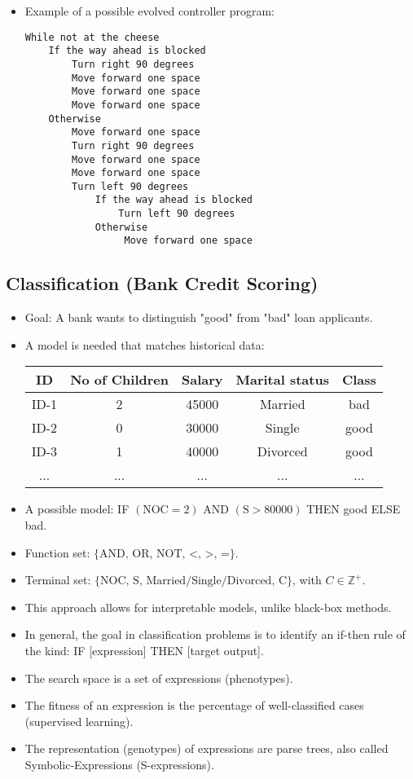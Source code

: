 \begin{itemize}
    \item Example of a possible evolved controller program:

\begin{lstlisting}[]
While not at the cheese
    If the way ahead is blocked
        Turn right 90 degrees
        Move forward one space
        Move forward one space
        Move forward one space
    Otherwise
        Move forward one space
        Turn right 90 degrees
        Move forward one space
        Move forward one space
        Turn left 90 degrees
            If the way ahead is blocked
                Turn left 90 degrees
            Otherwise
                 Move forward one space
\end{lstlisting}
\end{itemize}

\subsection*{Classification (Bank Credit Scoring)}
\begin{itemize}
    \item Goal: A bank wants to distinguish "good" from "bad" loan applicants.
    \item A model is needed that matches historical data:
    \begin{center}
    \begin{tabular}{ccccc}
        ID & No of Children & Salary & Marital status & Class \\
        \hline
        ID-1 & 2 & 45000 & Married & bad \\
        ID-2 & 0 & 30000 & Single & good \\
        ID-3 & 1 & 40000 & Divorced & good \\
        ... & ... & ... & ... & ...
    \end{tabular}
\end{center}
    \item  A possible model: IF $(\text{NOC} = 2)$ AND $(\text{S} > 80000)$ THEN good ELSE bad.
   \item  Function set: $\{\text{AND, OR, NOT, <, >, =}\}$.
    \item Terminal set: $\{\text{NOC, S, Married/Single/Divorced, C}\}$, with $C \in \mathbb{Z}^+$.
    \item This approach allows for interpretable models, unlike black-box methods.
    \item In general, the goal in classification problems is to identify an if-then rule of the kind: IF [expression] THEN [target output].
   \item The search space is a set of expressions (phenotypes).
   \item The fitness of an expression is the percentage of well-classified cases (supervised learning).
    \item The representation (genotypes) of expressions are parse trees, also called Symbolic-Expressions (S-expressions).
\end{itemize}

